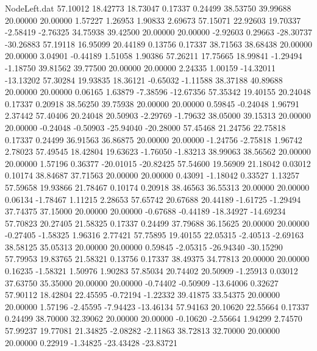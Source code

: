 \begin{filecontents}{NodeLeft.dat}
  57.10012   18.42773   18.73047     0.17337    0.24499   38.53750   39.99688   20.00000   20.00000    1.57227    1.26953    1.90833    2.69673
  57.15071   22.92603   19.70337    -2.58419   -2.76325   34.75938   39.42500   20.00000   20.00000   -2.92603    0.29663  -28.30737  -30.26883
  57.19118   16.95099   20.44189     0.13756    0.17337   38.71563   38.68438   20.00000   20.00000    3.04901   -0.44189    1.51058    1.90386
  57.26211   17.75665   18.99841    -1.29494   -1.18750   39.81562   39.77500   20.00000   20.00000    2.24335    1.00159  -14.32011  -13.13202
  57.30284   19.93835   18.36121    -0.65032   -1.11588   38.37188   40.89688   20.00000   20.00000    0.06165    1.63879   -7.38596  -12.67356
  57.35342   19.40155   20.24048     0.17337    0.20918   38.56250   39.75938   20.00000   20.00000    0.59845   -0.24048    1.96791    2.37442
  57.40406   20.24048   20.50903    -2.29769   -1.79632   38.05000   39.15313   20.00000   20.00000   -0.24048   -0.50903  -25.94040  -20.28000
  57.45468   21.24756   22.75818     0.17337    0.24499   36.91563   36.86875   20.00000   20.00000   -1.24756   -2.75818    1.96742    2.78023
  57.49545   18.42804   19.63623    -1.76050   -1.83213   38.99063   38.56562   20.00000   20.00000    1.57196    0.36377  -20.01015  -20.82425
  57.54600   19.56909   21.18042     0.03012    0.10174   38.84687   37.71563   20.00000   20.00000    0.43091   -1.18042    0.33527    1.13257
  57.59658   19.93866   21.78467     0.10174    0.20918   38.46563   36.55313   20.00000   20.00000    0.06134   -1.78467    1.11215    2.28653
  57.65742   20.67688   20.44189    -1.61725   -1.29494   37.74375   37.15000   20.00000   20.00000   -0.67688   -0.44189  -18.34927  -14.69234
  57.70823   20.27405   21.58325     0.17337    0.24499   37.79688   36.15625   20.00000   20.00000   -0.27405   -1.58325    1.96316    2.77421
  57.75895   19.40155   22.05315    -2.40513   -2.69163   38.58125   35.05313   20.00000   20.00000    0.59845   -2.05315  -26.94340  -30.15290
  57.79953   19.83765   21.58321     0.13756    0.17337   38.49375   34.77813   20.00000   20.00000    0.16235   -1.58321    1.50976    1.90283
  57.85034   20.74402   20.50909    -1.25913    0.03012   37.63750   35.35000   20.00000   20.00000   -0.74402   -0.50909  -13.64006    0.32627
  57.90112   18.42804   22.45595    -0.72194   -1.22332   39.41875   33.54375   20.00000   20.00000    1.57196   -2.45595   -7.94423  -13.46134
  57.94163   20.10620   22.55664     0.17337    0.24499   38.70000   32.39062   20.00000   20.00000   -0.10620   -2.55664    1.94299    2.74570
  57.99237   19.77081   21.34825    -2.08282   -2.11863   38.72813   32.70000   20.00000   20.00000    0.22919   -1.34825  -23.43428  -23.83721

\end{filecontents}
